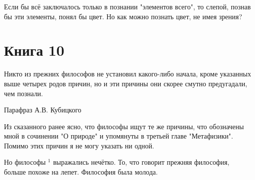 \documentclass[oneside, 17pt, dvipsnames]{extbook}
\begin{document}
Если бы всё заключалось только в познании "элементов всего", то слепой, познав бы эти элементы, понял бы цвет. Но как можно познать цвет, не имея зрения?







\newpage
\section{Книга 10}

\epigraph{
Никто из прежних философов не установил какого-либо начала, кроме указанных выше четырех родов причин, но и эти причины они скорее смутно предугадали, чем познали.
}{Парафраз А.В. Кубицкого}

Из сказанного ранее ясно, что философы ищут те же причины, что обозначены мной в сочинении "О природе" и упомянуты в третьей главе "Метафизики". Помимо этих причин я не могу указать ни одной.

Но философы $^1$ выражались нечётко. То, что говорит прежняя философия, больше похоже на лепет. Философия была молода.
\end{document}
